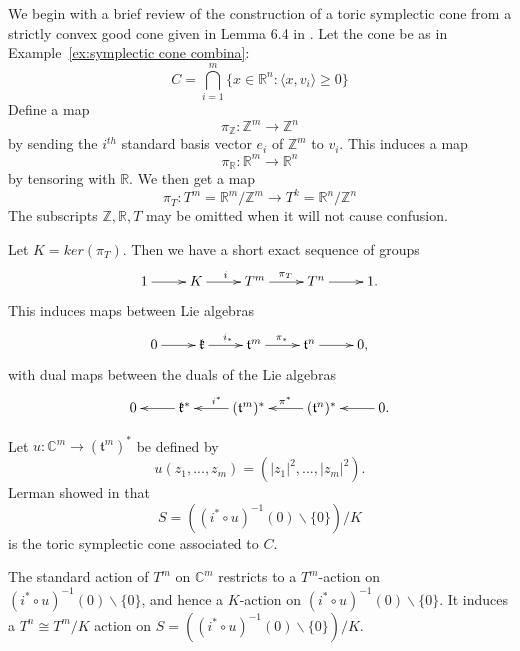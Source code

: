 \documentclass[12pt]{amsart}
\def\Z {{\mathbb{Z}}}
\def\R {{\mathbb{R}}}
\def\C {{\mathbb{C}}}
\theoremstyle{definition}
\numberwithin{equation}{section}
\begin{document}
We begin with a brief review of the construction of a toric
symplectic cone from a strictly convex good cone given in Lemma 6.4
in \cite{L:contact toric}. Let the cone be as in
Example~\ref{ex:symplectic cone combina}:
 \begin{equation}
  C= \bigcap_{i=1}^{m}\{x\in \R^n: \langle x, v_{i}\rangle \geq 0\}
\end{equation}
Define a map
\begin{equation}\label{eq:pi_Z contact}
\pi_{\Z}: \Z^m\rightarrow \Z^n
\end{equation}
by sending the $i^{th}$ standard basis vector $e_{i}$ of $\Z^m$ to
$v_{i}$. This induces a map
\begin{equation}
\pi_{\R}: \R^m\rightarrow \R^n
\end{equation}
by tensoring with $\R$. We then get a map
\begin{equation}\label{eq:pi_T contact}
\pi_{T}: T^m=\R^m/\Z^m \rightarrow T^k=\R^n/\Z^n
\end{equation}
The subscripts $\Z,\R,T$ may be omitted when it will not cause
confusion.

Let $K=ker (\pi_{T})$. Then we have a short exact sequence of groups
\begin{equation}\label{eq:KT^mT^n}
\xymatrix{
  1 \ar[r]^{} & K \ar[r]^{i} & T^m \ar[r]^{\pi_{T}} & T^n \ar[r]^{} & 1 .   }
\end{equation}
This induces maps between Lie algebras
\begin{equation}
\xymatrix{
  0 \ar[r]^{} & \mathfrak{k} \ar[r]^{i_{*}} & \mathfrak{t}^m \ar[r]^{\pi_{*}} & \mathfrak{t}^n \ar[r]^{} & 0 ,  }
\end{equation}
with dual maps between the duals of the Lie algebras
\begin{equation}\xymatrix{0 & \mathfrak{k}^*\ar[l]^{} &
(\mathfrak{t}^m)^* \ar[l]_{i^*}& (\mathfrak{t}^n)^*\ar[l]_{\pi^*}& 0
.\ar[l]}
\end{equation}

Let $u:\C^m\rightarrow (\mathfrak{t}^m)^*$ be defined by
\begin{equation}\label{eq:std moment contact}
u(z_{1},...,z_{m})=(|z_{1}|^2,...,|z_{m}|^2).
\end{equation}
Lerman showed in \cite{L:contact toric} that
\begin{equation} S=((i^{*}\circ u)^{-1}(0)\backslash \{0\})/K
\end{equation} is the toric symplectic cone associated to
$C$.

The standard action of $T^m$ on $\C^m$ restricts to a $T^m$-action
on $(i^{*}\circ u)^{-1}(0)\backslash \{0\}$, and hence a $K$-action
on $(i^{*}\circ u)^{-1}(0)\backslash \{0\}$. It induces a $T^n\cong
T^m/K$ action on $S=((i^{*}\circ u)^{-1}(0)\backslash \{0\})/K$.
\end{document}
